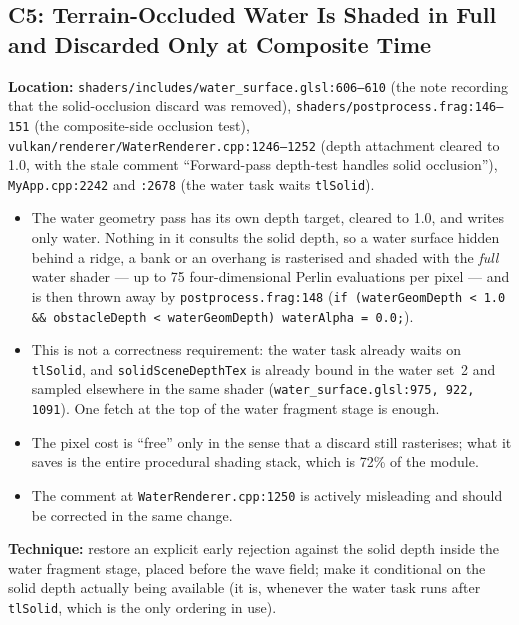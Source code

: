 \documentclass[11pt,a4paper]{article}
\begin{document}
\subsection{C5: Terrain-Occluded Water Is Shaded in Full and Discarded Only at Composite Time}

\textbf{Location:} \texttt{shaders/includes/water\_surface.glsl:606--610} (the note recording that the
solid-occlusion discard was removed), \texttt{shaders/postprocess.frag:146--151} (the composite-side occlusion test),
\texttt{vulkan/renderer/WaterRenderer.cpp:1246--1252} (depth attachment cleared to 1.0, with the stale comment
``Forward-pass depth-test handles solid occlusion''), \texttt{MyApp.cpp:2242} and \texttt{:2678} (the water task waits
\texttt{tlSolid}).

\begin{itemize}
    \item The water geometry pass has its own depth target, cleared to 1.0, and writes only water. Nothing in it
    consults the solid depth, so a water surface hidden behind a ridge, a bank or an overhang is rasterised and shaded
    with the \emph{full} water shader --- up to 75 four-dimensional Perlin evaluations per pixel --- and is then thrown
    away by \texttt{postprocess.frag:148} (\texttt{if (waterGeomDepth < 1.0 \&\& obstacleDepth < waterGeomDepth)
    waterAlpha = 0.0;}).
    \item This is not a correctness requirement: the water task already waits on \texttt{tlSolid}, and
    \texttt{solidSceneDepthTex} is already bound in the water set~2 and sampled elsewhere in the same shader
    (\texttt{water\_surface.glsl:975, 922, 1091}). One fetch at the top of the water fragment stage is enough.
    \item The pixel cost is ``free'' only in the sense that a discard still rasterises; what it saves is the entire
    procedural shading stack, which is 72\% of the module.
    \item The comment at \texttt{WaterRenderer.cpp:1250} is actively misleading and should be corrected in the same
    change.
\end{itemize}

\textbf{Technique:} restore an explicit early rejection against the solid depth inside the water fragment stage, placed
before the wave field; make it conditional on the solid depth actually being available (it is, whenever the water task
runs after \texttt{tlSolid}, which is the only ordering in use).
\end{document}
